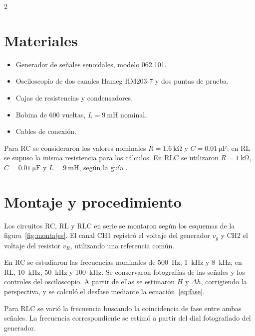 \documentclass[10pt,letterpaper]{article}
\begin{document}
\begin{multicols}{2}
\section{Materiales}
\begin{itemize}
  \item Generador de señales senoidales, modelo 062.101.
  \item Osciloscopio de dos canales Hameg HM203-7 y dos puntas de prueba.
  \item Cajas de resistencias y condensadores.
  \item Bobina de 600 vueltas, $L=\SI{9}{\milli\henry}$ nominal.
  \item Cables de conexión.
\end{itemize}

Para RC se consideraron los valores nominales $R=\SI{1.6}{\kilo\ohm}$ y $C=\SI{0.01}{\micro\farad}$; en RL se supuso la misma resistencia para los cálculos. En RLC se utilizaron $R=\SI{1}{\kilo\ohm}$, $C=\SI{0.01}{\micro\farad}$ y $L=\SI{9}{\milli\henry}$, según la guía \cite{guia2026}.

\section{Montaje y procedimiento}

Los circuitos RC, RL y RLC en serie se montaron según los esquemas de la figura~\ref{fig:montajes}. El canal CH1 registró el voltaje del generador $v_g$ y CH2 el voltaje del resistor $v_R$, utilizando una referencia común.

En RC se estudiaron las frecuencias nominales de \SI{500}{\hertz}, \SI{1}{\kilo\hertz} y \SI{8}{\kilo\hertz}; en RL, \SI{10}{\kilo\hertz}, \SI{50}{\kilo\hertz} y \SI{100}{\kilo\hertz}. Se conservaron fotografías de las señales y los controles del osciloscopio. A partir de ellas se estimaron $H$ y $\Delta h$, corrigiendo la perspectiva, y se calculó el desfase mediante la ecuación~\eqref{eq:fase}.

Para RLC se varió la frecuencia buscando la coincidencia de fase entre ambas señales. La frecuencia correspondiente se estimó a partir del dial fotografiado del generador.
\end{multicols}

\begin{center}
 

 \label{fig:montajes}
\end{center}
\end{document}
